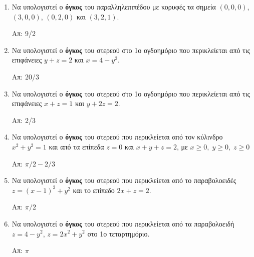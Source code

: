   \begin{enumerate}
  \item Να υπολογιστεί ο \textbf{όγκος} του παραλληλεπιπέδου με κορυφές τα σημεία 
    $ (0,0,0) $, $ (3,0,0) $, $ (0,2,0) $ και $ (3,2,1) $. 

    \hfill Απ: 9/2 

  \item Να υπολογιστεί ο \textbf{όγκος} του στερεού στο 1ο ογδοημόριο που περικλείεται 
    από τις επιφάνειες $y+z=2$ και $x=4-y^{2}$. 

    \hfill Απ: 20/3 

  \item Να υπολογιστεί ο \textbf{όγκος} του στερεού στο 1ο ογδοημόριο που περικλείεται 
    από τις επιφάνειες $ x+z=1 $ και $ y+2z=2 $. 

    \hfill Απ: 2/3 

  \item Να υπολογιστεί ο \textbf{όγκος} του στερεού που περικλείεται από τον κύλινδρο 
    $ x^{2}+y^{2}=1 $ και από τα επίπεδα $ z=0 $ και $ x+y+z=2 $, με 
    $ x \geq 0, \; y \geq 0, \; z \geq 0$ 

    \hfill Απ: $ {\pi}/{2} - {2}/{3} $ 

  \item Να υπολογιστεί ο \textbf{όγκος} του στερεού που περικλείεται από το 
    παραβολοειδές  $ z = (x-1)^{2}+y^{2} $ και το επίπεδο $ 2x+z=2 $.
   
    \hfill Απ: $ {\pi}/{2} $

  \item Να υπολογιστεί ο \textbf{όγκος} του στερεού που περικλείεται από τα παραβολοειδή 
    $ z = 4 -y^{2} $, $ z = 2x^{2}+y^{2} $ στο 1ο τεταρτημόριο. 
   
    \hfill Απ: $ \pi $ 
\end{enumerate}




